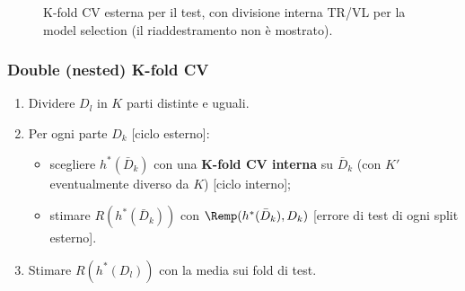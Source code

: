 \begin{figure}[ht]
\centering
{}
\caption{K-fold CV esterna per il test, con divisione interna TR/VL per la model selection (il riaddestramento non
è mostrato).}
\label{fig:kfold-holdout}
\end{figure}

\subsubsection{Double (nested) K-fold CV}

\begin{algoritmo}
\begin{enumerate}
  \item Dividere $D_l$ in $K$ parti distinte e uguali.
  \item Per ogni parte $D_k$ [ciclo esterno]:
        \begin{itemize}
          \item scegliere $h^*(\bar D_k)$ con una \textbf{K-fold CV interna} su $\bar D_k$ (con $K'$ eventualmente
                diverso da $K$) [ciclo interno];
          \item stimare $R(h^*(\bar D_k))$ con $\Remp(h^*(\bar D_k),D_k)$ [errore di test di ogni split esterno].
        \end{itemize}
  \item Stimare $R(h^*(D_l))$ con la media sui fold di test.
\end{enumerate}
\end{algoritmo}

